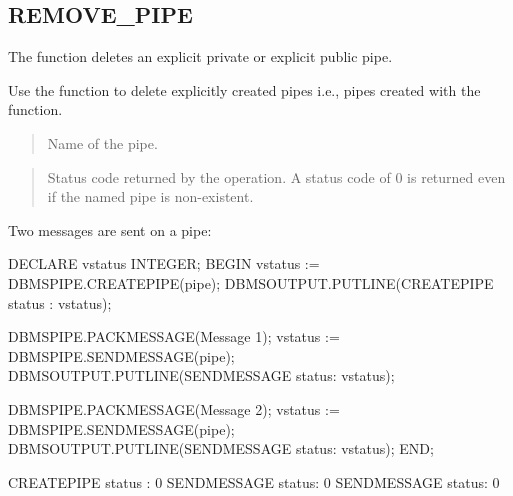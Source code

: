 \documentclass[letterpaper,10pt,english,openany,oneside]{sphinxmanual}
\begin{document}
\newpage


\subsection{REMOVE\_PIPE}
\label{\detokenize{remove_pipe::doc}}\label{\detokenize{remove_pipe:remove-pipe}}
The  function deletes an explicit private or explicit public
pipe.


Use the  function to delete explicitly created pipes \textendash{} i.e.,
pipes created with the  function.


\begin{quote}

Name of the pipe.
\end{quote}

\begin{quote}

Status code returned by the operation. A status code of 0 is returned
even if the named pipe is non-existent.
\end{quote}


Two messages are sent on a pipe:

%
\begin{sphinxVerbatim}[commandchars=\\\{\}]
DECLARE
    v\PYGZus{}status        INTEGER;
BEGIN
    v\PYGZus{}status := DBMS\PYGZus{}PIPE.CREATE\PYGZus{}PIPE(\PYGZsq{}pipe\PYGZsq{});
    DBMS\PYGZus{}OUTPUT.PUT\PYGZus{}LINE(\PYGZsq{}CREATE\PYGZus{}PIPE status : \PYGZsq{} \textbar{}\textbar{} v\PYGZus{}status);

    DBMS\PYGZus{}PIPE.PACK\PYGZus{}MESSAGE(\PYGZsq{}Message \PYGZsh{}1\PYGZsq{});
    v\PYGZus{}status := DBMS\PYGZus{}PIPE.SEND\PYGZus{}MESSAGE(\PYGZsq{}pipe\PYGZsq{});
    DBMS\PYGZus{}OUTPUT.PUT\PYGZus{}LINE(\PYGZsq{}SEND\PYGZus{}MESSAGE status: \PYGZsq{} \textbar{}\textbar{} v\PYGZus{}status);

    DBMS\PYGZus{}PIPE.PACK\PYGZus{}MESSAGE(\PYGZsq{}Message \PYGZsh{}2\PYGZsq{});
    v\PYGZus{}status := DBMS\PYGZus{}PIPE.SEND\PYGZus{}MESSAGE(\PYGZsq{}pipe\PYGZsq{});
    DBMS\PYGZus{}OUTPUT.PUT\PYGZus{}LINE(\PYGZsq{}SEND\PYGZus{}MESSAGE status: \PYGZsq{} \textbar{}\textbar{} v\PYGZus{}status);
END;

CREATE\PYGZus{}PIPE status : 0
SEND\PYGZus{}MESSAGE status: 0
SEND\PYGZus{}MESSAGE status: 0
\end{sphinxVerbatim}
\end{document}
